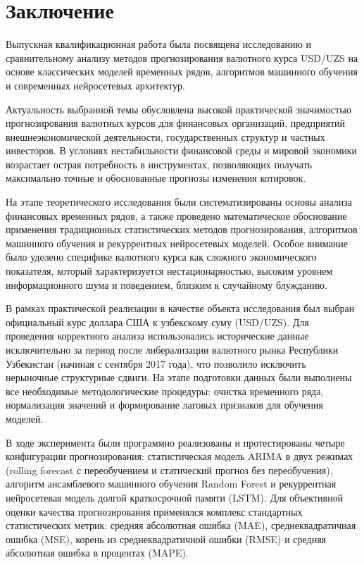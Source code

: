 \chapter*{Заключение}

Выпускная квалификационная работа была посвящена исследованию и сравнительному анализу методов прогнозирования валютного курса USD/UZS на основе классических моделей временных рядов, алгоритмов машинного обучения и современных нейросетевых архитектур.

Актуальность выбранной темы обусловлена высокой практической значимостью прогнозирования валютных курсов для финансовых организаций, предприятий внешнеэкономической деятельности, государственных структур и частных инвесторов. В условиях нестабильности финансовой среды и мировой экономики возрастает острая потребность в инструментах, позволяющих получать максимально точные и обоснованные прогнозы изменения котировок.

На этапе теоретического исследования были систематизированы основы анализа финансовых временных рядов, а также проведено математическое обоснование применения традиционных статистических методов прогнозирования, алгоритмов машинного обучения и рекуррентных нейросетевых моделей. Особое внимание было уделено специфике валютного курса как сложного экономического показателя, который характеризуется нестационарностью, высоким уровнем информационного шума и поведением, близким к случайному блужданию.

В рамках практической реализации в качестве объекта исследования был выбран официальный курс доллара США к узбекскому суму (USD/UZS). Для проведения корректного анализа использовались исторические данные исключительно за период после либерализации валютного рынка Республики Узбекистан (начиная с сентября 2017 года), что позволило исключить нерыночные структурные сдвиги. На этапе подготовки данных были выполнены все необходимые методологические процедуры: очистка временного ряда, нормализация значений и формирование лаговых признаков для обучения моделей.

В ходе эксперимента были программно реализованы и протестированы четыре конфигурации прогнозирования: статистическая модель ARIMA в двух режимах (rolling forecast с переобучением и статический прогноз без переобучения), алгоритм ансамблевого машинного обучения Random Forest и рекуррентная нейросетевая модель долгой краткосрочной памяти (LSTM). Для объективной оценки качества прогнозирования применялся комплекс стандартных статистических метрик: средняя абсолютная ошибка (MAE), среднеквадратичная ошибка (MSE), корень из среднеквадратичной ошибки (RMSE) и средняя абсолютная ошибка в процентах (MAPE).

